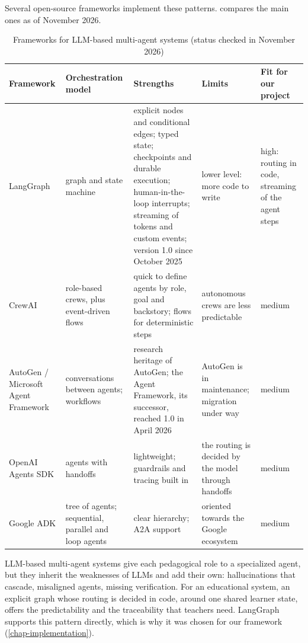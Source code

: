 Several open-source frameworks implement these patterns.
 compares the main ones as of November 2026.

\begin{table}[htbp]
\centering
\caption[Frameworks for LLM-based multi-agent systems]{Frameworks for
LLM-based multi-agent systems (status checked in November 2026)}
\label{tab-frameworks}
\scriptsize
\begin{tabularx}{\textwidth}{@{}L{2.2cm}L{2.3cm}YYL{2.2cm}@{}}
\toprule
\textbf{Framework} & \textbf{Orchestration model} & \textbf{Strengths} & \textbf{Limits} & \textbf{Fit for our project} \\
\midrule
LangGraph \cite{langgraph_docs,langgraph1_2025} & graph and state machine & explicit nodes and conditional edges; typed state; checkpoints and durable execution; human-in-the-loop interrupts; streaming of tokens and custom events; version 1.0 since October 2025 & lower level: more code to write & high: routing in code, streaming of the agent steps \\
CrewAI \cite{crewai_docs} & role-based crews, plus event-driven flows & quick to define agents by role, goal and backstory; flows for deterministic steps & autonomous crews are less predictable & medium \\
AutoGen / Microsoft Agent Framework \cite{wu2024autogen,msagent_docs} & conversations between agents; workflows & research heritage of AutoGen; the Agent Framework, its successor, reached 1.0 in April 2026 & AutoGen is in maintenance; migration under way & medium \\
OpenAI Agents SDK \cite{openai_agents_docs} & agents with handoffs & lightweight; guardrails and tracing built in & the routing is decided by the model through handoffs & medium \\
Google ADK \cite{google_adk_docs} & tree of agents; sequential, parallel and loop agents & clear hierarchy; A2A support & oriented towards the Google ecosystem & medium \\
\bottomrule
\end{tabularx}
\end{table}

\begin{summarybox}[Takeaway]
LLM-based multi-agent systems give each pedagogical role to a specialized
agent, but they inherit the weaknesses of LLMs and add their own:
hallucinations that cascade, misaligned agents, missing verification. For
an educational system, an explicit graph whose routing is decided in code,
around one shared learner state, offers the predictability and the
traceability that teachers need. LangGraph supports this pattern directly,
which is why it was chosen for our framework (\cref{chap-implementation}).
\end{summarybox}


